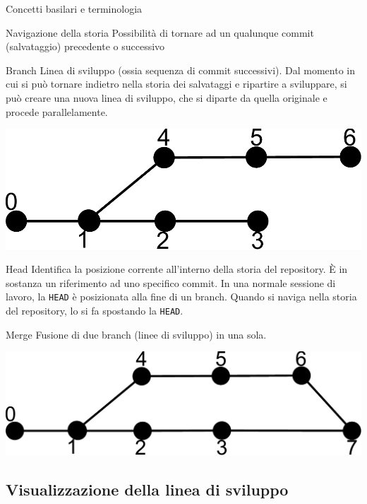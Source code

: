 \documentclass[presentation]{beamer}
\begin{document}
\begin{frame}[allowframebreaks]{Concetti basilari e terminologia}
	\begin{block}{Navigazione della storia}
		Possibilità di tornare ad un qualunque commit (salvataggio) precedente o successivo
	\end{block}
	\begin{block}{Branch}
		Linea di sviluppo (ossia sequenza di commit successivi). Dal momento in cui si può tornare indietro nella storia dei salvataggi e ripartire a sviluppare, si può creare una nuova linea di sviluppo, che si diparte da quella originale e procede parallelamente.
		\begin{center}
			\includegraphics[height=.4\textheight]{img/branch}
		\end{center}
	\end{block}
	\begin{block}{Head}
		Identifica la posizione corrente all'interno della storia del repository.
		È in sostanza un riferimento ad uno specifico commit.
		In una normale sessione di lavoro, la \texttt{HEAD} è posizionata alla fine di un branch.
		Quando si naviga nella storia del repository, lo si fa spostando la \texttt{HEAD}.
	\end{block}
	\begin{block}{Merge}
		Fusione di due branch (linee di sviluppo) in una sola.
		\begin{center}
			\includegraphics[width=.99\textwidth]{img/merge}
		\end{center}
	\end{block}
\end{frame}

\subsection{Visualizzazione della linea di sviluppo}
\end{document}
